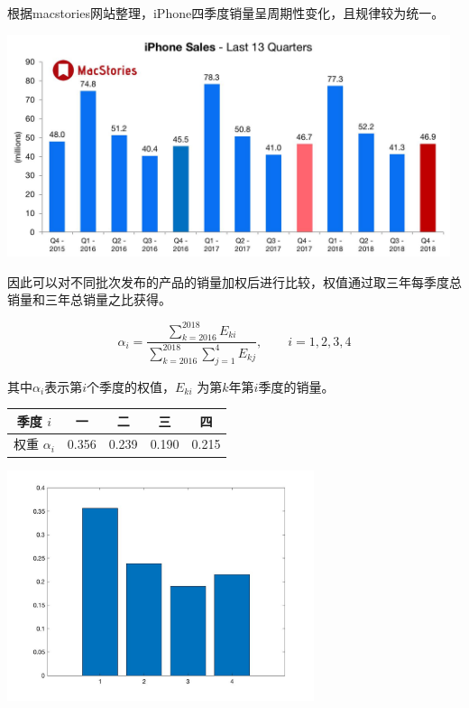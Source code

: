 \documentclass[12pt]{ctexart}
\begin{document}
            根据macstories网站整理，iPhone四季度销量呈周期性变化，且规律较为统一。

            \begin{center}
                \includegraphics[width=13cm]{quarters.jpg}
            \end{center}

            因此可以对不同批次发布的产品的销量加权后进行比较，权值通过取三年每季度总销量和三年总销量之比获得。

            \begin{equation} %
                \alpha _i= \frac{\sum\limits_{k = 2016}^{2018} E _{ki} }{ \sum\limits_{k = 2016}^{2018} \sum\limits_{j = 1}^{4}E _{kj} }, \qquad i=1,2,3,4
            \end{equation} 

            其中$\alpha _i$表示第$i$个季度的权值，$E _{ki}$ 为第$k$年第$i$季度的销量。

            \begin{center}
                \begin{tabular}{|c|c|c|c|c|}
                    \hline
                    季度 $i$ & 一&二&三&四\\
                    \hline
                    权重 $\alpha _i$&0.356 &0.239&0.190 &0.215\\
                    \hline
                \end{tabular}
            \end{center}

            \begin{center}
                \includegraphics[width=9cm]{per-quaters.jpg}
            \end{center}
             
\end{document}
